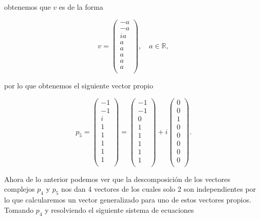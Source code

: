 \documentclass[letterpaper]{article}
\theoremstyle{definition}
\theoremstyle{lemathm}
\theoremstyle{lemademthm}
\newcommand{\pars}[1]{\left( #1 \right) }
\newcommand{\RR}{\mathbb{R}}
\newcommand{\1}{\mathbbm{1}}
\begin{document}
\begin{enumerate}
\begin{itemize}
			obtenemos que $v$ es de la forma

			\[v = \pars{\begin{array}{c}
				-a\\[1ex]
				-a\\[1ex]
				ia\\[1ex]
				a\\[1ex]
				a\\[1ex]
				a\\[1ex]
				a\\[1ex]
				a\\
			\end{array}}, \quad a\in\RR,\]

			por lo que obtenemos el siguiente vector propio

			\[p_5 = \pars{\begin{array}{c}
				-1\\[1ex]
				-1\\[1ex]
				i\\[1ex]
				1\\[1ex]
				1\\[1ex]
				1\\[1ex]
				1\\[1ex]
				1\\
			\end{array}} = \pars{\begin{array}{c}
				-1\\[1ex]
				-1\\[1ex]
				0\\[1ex]
				1\\[1ex]
				1\\[1ex]
				1\\[1ex]
				1\\[1ex]
				1\\
			\end{array}} + i\pars{\begin{array}{c}
				0\\[1ex]
				0\\[1ex]
				1\\[1ex]
				0\\[1ex]
				0\\[1ex]
				0\\[1ex]
				0\\[1ex]
				0\\
			\end{array}}.\]

		\end{itemize}

		Ahora de lo anterior podemos ver que la descomposición de los vectores complejos $p_4$ y $p_5$ nos dan 4 vectores de los cuales solo 2 son independientes por lo que calcularemos un vector generalizado para uno de estos vectores propios. Tomando $p_4$ y resolviendo el siguiente sistema de ecuaciones


\end{enumerate}
\end{document}
